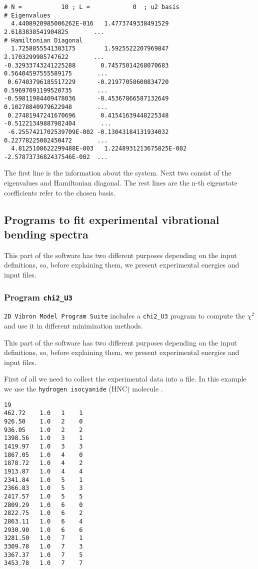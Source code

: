 \documentclass[a4paper,12pt,captions=tableheading]{article}
\begin{document}
\begin{verbatim}
# N =           10 ; L =            0  ; u2 basis
# Eigenvalues 
  4.4408920985006262E-016   1.4773749338491529        2.6183838541904825       ...  
# Hamiltonian Diagonal 
  1.7258855541303175        1.5925522207969847        2.1703299985747622       ... 
-0.32933743241225288       0.74575014268070683       0.56404597555589175       ... 
 0.67403796185517229      -0.21977058600834720       0.59697091199520735       ... 
-0.59811984409478036      -0.45367866587132649       0.10278840979622948       ... 
 0.27481947241670696       0.41541639448225348      -0.51221349887982404       ... 
 -6.2557421702539709E-002 -0.13043184131934032       0.22778225002450472       ...    
  4.8125108622299488E-003   1.2248931213675825E-002  -2.5787373682437546E-002  ...
\end{verbatim}

The first line is the information about the system. Next two consist of the eigenvalues and Hamiltonian diagonal. The rest lines are the n-th eigenstate coefficients refer to the chosen basis.





\subsection{Programs to fit experimental vibrational bending spectra}
\label{sec-3-2}
This part of the software has two different purposes depending on the input definitions, so, before explaining them, we present experimental energies and input files.
\subsubsection{Program \texttt{chi2\_U3}}
\label{sec-3-2-1}
\label{chi2p}
    \verb~2D Vibron Model Program Suite~ includes a \verb~chi2_U3~ program to compute the \(\chi^2\) and use it in different minimization methods.

This part of the software has two different purposes depending on the input definitions, so, before explaining them, we present experimental energies and input files.

First of all we need to collect the experimental data into a file. In this example we use the \verb~hydrogen isocyanide~ (HNC) molecule \cite{MellauHNC,BunkerHNC}.

\begin{verbatim}
19
462.72    1.0   1    1  
926.50    1.0   2    0  
936.05    1.0   2    2  
1398.56   1.0   3    1 
1419.97   1.0   3    3 
1867.05   1.0   4    0 
1878.72   1.0   4    2 
1913.87   1.0   4    4 
2341.84   1.0   5    1 
2366.83   1.0   5    3 
2417.57   1.0   5    5 
2809.29   1.0   6    0 
2822.75   1.0   6    2 
2863.11   1.0   6    4 
2930.90   1.0   6    6 
3281.50   1.0   7    1 
3309.78   1.0   7    3 
3367.37   1.0   7    5 
3453.78   1.0   7    7
\end{verbatim}
\end{document}
